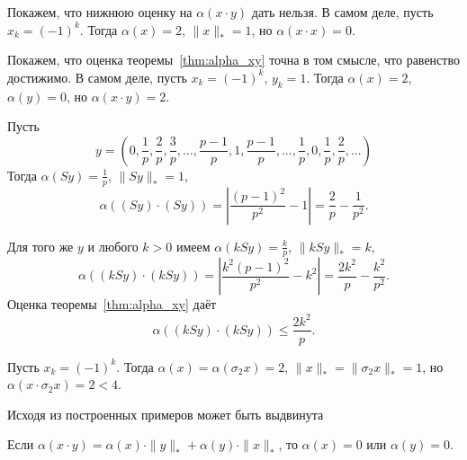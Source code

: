 \begin{example}
	Покажем, что нижнюю оценку на $\alpha(x\cdot y)$ дать нельзя.
	В самом деле,
	пусть $x_k = (-1)^k$.
	Тогда $\alpha(x) = 2$, $\|x\|_* = 1$,
	но $\alpha(x\cdot x) = 0$.
\end{example}

\begin{example}
	\label{ex:alpha-c_not_ideal}
	Покажем, что оценка теоремы~\ref{thm:alpha_xy} точна в том смысле,
	что равенство достижимо.
	В самом деле,
	пусть $x_k = (-1)^k$, $y_k = 1$.
	Тогда $\alpha(x) = 2$, $\alpha(y) = 0$,
	но $\alpha(x\cdot y) = 2$.
\end{example}

\begin{example}
	Пусть
	\begin{equation}
		y = \left(
			0, \frac{1}{p}, \frac{2}{p}, \frac{3}{p},
			...,
			\frac{p-1}{p}, 1, \frac{p-1}{p},
			...,
			\frac{1}{p},
			0,
			\frac{1}{p}, \frac{2}{p}, ...
		\right)
	\end{equation}
	Тогда $\alpha(Sy) = \frac{1}{p}$, $\|Sy\|_* = 1$,
	\begin{equation}
		\alpha((Sy)\cdot(Sy)) =
		\left| \frac{(p-1)^2}{p^2} - 1 \right| =
		\frac{2}{p}-\frac{1}{p^2}
		.
	\end{equation}
\end{example}

\begin{example}
	Для того же $y$ и любого $k>0$ имеем
	$\alpha(kSy) = \frac{k}{p}$, $\|kSy\|_* = k$,
	\begin{equation}
		\alpha((kSy)\cdot(kSy)) =
		\left| \frac{k^2(p-1)^2}{p^2} - k^2 \right| =
		\frac{2k^2}{p}-\frac{k^2}{p^2}
		.
	\end{equation}
	Оценка теоремы~\ref{thm:alpha_xy} даёт
	\begin{equation}
		\alpha((kSy)\cdot(kSy)) \leq
		\frac{2k^2}{p}
		.
	\end{equation}
\end{example}



\begin{example}
	Пусть $x_k = (-1)^k$.
	Тогда $\alpha(x) = \alpha(\sigma_2 x) = 2$, $\|x\|_* = \|\sigma_2 x\|_* = 1$,
	но $\alpha(x\cdot \sigma_2 x) = 2 < 4$.
\end{example}

Исходя из построенных примеров может быть выдвинута
\begin{hypothesis}
	Если $\alpha(x\cdot y)= \alpha(x)\cdot \|y\|_* + \alpha(y)\cdot \|x\|_*$,
	то $\alpha(x) = 0$ или $\alpha(y) = 0$.
\end{hypothesis}
